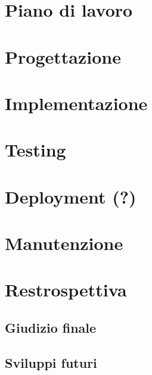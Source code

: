 \documentclass[a4paper,12pt]{report}
\begin{document}
\chapter{Piano di lavoro}

\chapter{Progettazione}

\chapter{Implementazione}

\chapter{Testing} 

\chapter{Deployment (?)}

\chapter{Manutenzione}

\chapter{Restrospettiva}
\section{Giudizio finale}
\section{Sviluppi futuri}

 
\end{document}
